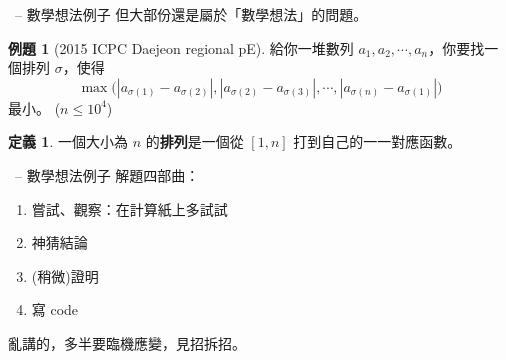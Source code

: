 \documentclass[notheorems]{beamer}
\newcommand\abs[1]{\left\lvert #1 \right\rvert}
\theoremstyle{definition}
\newtheorem{problem}{例題}
\newtheorem{definition}{定義}
\renewcommand*{\emph}[1]{{\bf #1}}
\begin{document}
\begin{frame}[t]{\secname \ -- 數學想法例子}
  但大部份還是屬於「數學想法」的問題。

  \pause
  \medskip
  \begin{problem}[2015 ICPC Daejeon regional pE]
    給你一堆數列 $a_1, a_2, \cdots, a_n$，你要找一個排列 $\sigma$，使得
    \[ \max \Big(
      \abs{a_{\sigma(1)} - a_{\sigma(2)}},
      \abs{a_{\sigma(2)} - a_{\sigma(3)}}, \cdots,
      \abs{a_{\sigma(n)} - a_{\sigma(1)}}
      \Big) \]
    最小。 ($n \leq 10^4$)
  \end{problem}

  \pause
  \begin{definition}
    一個大小為 $n$ 的\emph{排列}是一個從 $[1, n]$ 打到自己的一一對應函數。
  \end{definition}
\end{frame}

\begin{frame}[t]{\secname \ -- 數學想法例子}
  解題四部曲：
  \pause

  \begin{enumerate}[<+->]
    \item 嘗試、觀察：在計算紙上多試試
    \item 神猜結論
    \item {\color{gray} (稍微)}證明
    \item 寫 code
  \end{enumerate}
  \pause

  \bigskip
  亂講的，多半要臨機應變，見招拆招。
\end{frame}
\end{document}
